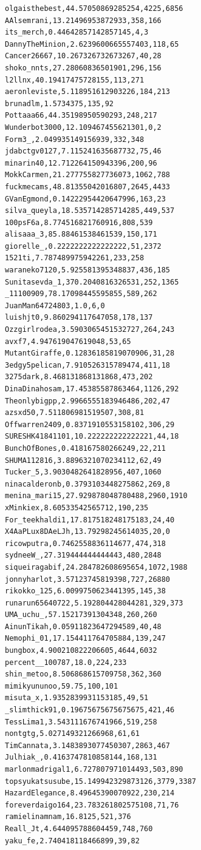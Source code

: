 \begin{verbatim}
olgaisthebest,44.57050869285254,4225,6856
AAlsemrani,13.21496953872933,358,166
its_merch,0.44642857142857145,4,3
DannyTheMinion,2.6239600665557403,118,65
Cancer26667,10.267326732673267,40,28
shoko_nnts,27.28060836501901,296,156
l2llnx,40.19417475728155,113,271
aeronleviste,5.118951612903226,184,213
brunadlm,1.5734375,135,92
Pottaaa66,44.35198950590293,248,217
Wunderbot3000,12.109467455621301,0,2
Form3_,2.049935149156939,332,348
jdabctgv0127,7.115241635687732,75,46
minarin40,12.712264150943396,200,96
MokkCarmen,21.277755827736073,1062,788
fuckmecams,48.81355042016807,2645,4433
GVanEgmond,0.14222954420647996,163,23
silva_queyla,18.535714285714285,449,537
100psF6a,8.774516821760916,808,539
alisaaa_3,85.88461538461539,150,171
giorelle_,0.2222222222222222,51,2372
1521ti,7.787489975942261,233,258
waraneko7120,5.925581395348837,436,185
Sunitasevda_1,370.2040816326531,252,1365
_11100909,78.17098445595855,589,262
JuanMan64724803,1.0,6,0
luishjt0,9.860294117647058,178,137
Ozzgirlrodea,3.5903065451532727,264,243
avxf7,4.947619047619048,53,65
MutantGiraffe,0.12836185819070906,31,28
3edgy5pelican,7.910526315789474,411,18
3275dark,8.468131868131868,473,202
DinaDinahosam,17.45385587863464,1126,292
Theonlybigpp,2.9966555183946486,202,47
azsxd50,7.511806981519507,308,81
Offwarren2409,0.8371910553158102,306,29
SURESHK41841101,10.222222222222221,44,18
BunchOfBones,0.418167580266249,22,211
SHUMA112816,3.8896321070234112,62,49
Tucker_5,3.9030482641828956,407,1060
ninacalderonb,0.3793103448275862,269,8
menina_mari15,27.929878048780488,2960,1910
xMinkiex,8.60533542565712,190,235
For_teekhaldi1,17.817518248175183,24,40
X4AaPLux8DAeLJh,13.79298245614035,20,0
ricowputra,0.7462558836114677,474,318
sydneeW_,27.319444444444443,480,2848
siqueiragabif,24.284782608695654,1072,1988
jonnyharlot,3.57123745819398,727,26880
rikokko_125,6.0099750623441395,145,38
runarun65640722,5.192804428044281,329,373
UMA_uchu_,57.15217391304348,260,260
AinunTikah,0.05911823647294589,40,48
Nemophi_01,17.154411764705884,139,247
bungbox,4.900210822206605,4644,6032
percent__100787,18.0,224,233
shin_metoo,8.506868615709758,362,360
mimikyununoo,59.75,100,101
misuta_x,1.9352839931153185,49,51
_slimthick91,0.19675675675675675,421,46
TessLima1,3.543111676741966,519,258
nontgtg,5.027149321266968,61,61
TimCannata,3.1483893077450307,2863,467
Julhiak_,0.4163747810858144,168,131
marlonmadrigal1,6.727807971014493,503,890
topsyukatsusube,15.149942329873126,3779,3387
HazardElegance,8.49645390070922,230,214
foreverdaigo164,23.783261802575108,71,76
ramielinamnam,16.8125,521,376
Reall_Jt,4.644095788604459,748,760
yaku_fe,2.740418118466899,39,82

\end{verbatim}
